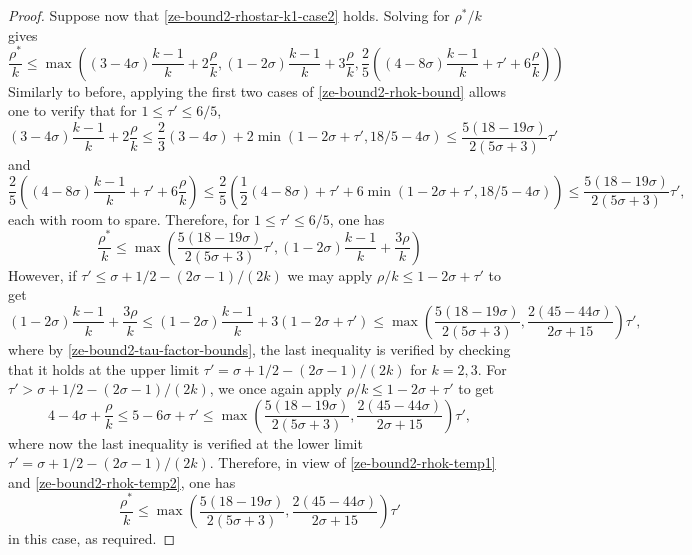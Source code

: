 \begin{proof}
Suppose now that \eqref{ze-bound2-rhostar-k1-case2} holds. Solving for $\rho^*/k$ gives
\[
\frac{\rho^*}{k} \le \max\left((3 - 4\sigma)\frac{k - 1}{k} + 2\frac{\rho}{k}, (1 - 2\sigma)\frac{k - 1}{k} + 3\frac{\rho}{k}, \frac{2}{5}((4 - 8\sigma)\frac{k - 1}{k} + \tau' + 6\frac{\rho}{k})\right)
\]
Similarly to before, applying the first two cases of \eqref{ze-bound2-rhok-bound} allows one to verify that for $1 \le \tau' \le 6/5$,
\[
(3 - 4\sigma)\frac{k - 1}{k} + 2\frac{\rho}{k} \le \frac{2}{3}(3 - 4\sigma) + 2\min(1 - 2\sigma + \tau', 18/5 - 4\sigma) \le \frac{5(18-19\sigma)}{2(5\sigma+3)}\tau'
\]
and
\[
\frac{2}{5}((4 - 8\sigma)\frac{k - 1}{k} + \tau' + 6\frac{\rho}{k}) \le \frac{2}{5}(\frac{1}{2}(4 - 8\sigma) + \tau' + 6\min(1 - 2\sigma + \tau', 18/5 - 4\sigma)) \le \frac{5(18-19\sigma)}{2(5\sigma+3)}\tau',
\]
each with room to spare. Therefore, for $1 \le \tau' \le 6/5$, one has
\begin{equation}\label{ze-bound2-rhok-temp2}
\frac{\rho^*}{k} \le \max\left(\frac{5(18 - 19\sigma)}{2(5\sigma + 3)}\tau', (1 - 2\sigma)\frac{k - 1}{k} + \frac{3\rho}{k}\right)
\end{equation}
    However, if $\tau' \le \sigma + 1/2 - (2\sigma - 1)/(2k)$ we may apply $\rho/k \le 1 - 2\sigma + \tau'$ to get
    \[
    (1 - 2\sigma)\frac{k - 1}{k} + \frac{3\rho}{k} \le (1 - 2\sigma)\frac{k - 1}{k} + 3(1 - 2\sigma + \tau') \le \max\left(\frac{5(18 - 19\sigma)}{2(5\sigma + 3)}, \frac{2(45 - 44\sigma)}{2\sigma + 15}\right)\tau',
    \]
    where by \eqref{ze-bound2-tau-factor-bounds}, the last inequality is verified by checking that it holds at the upper limit $\tau' = \sigma + 1/2 - (2\sigma - 1)/(2k)$ for $k = 2,3$. For $\tau' > \sigma + 1/2 - (2\sigma - 1)/(2k)$, we once again apply $\rho/k \le 1 - 2\sigma + \tau'$ to get
    \[
    4 - 4\sigma + \frac{\rho}{k} \le 5 - 6\sigma + \tau' \le \max\left(\frac{5(18 - 19\sigma)}{2(5\sigma + 3)}, \frac{2(45 - 44\sigma)}{2\sigma + 15}\right)\tau',
    \]
    where now the last inequality is verified at the lower limit $\tau' = \sigma + 1/2 - (2\sigma - 1)/(2k)$.
    Therefore, in view of \eqref{ze-bound2-rhok-temp1} and \eqref{ze-bound2-rhok-temp2}, one has
    \[
    \frac{\rho^*}{k} \le \max\left(\frac{5(18 - 19\sigma)}{2(5\sigma + 3)}, \frac{2(45 - 44\sigma)}{2\sigma + 15}\right)\tau'
    \]
    in this case, as required.


\end{proof}
